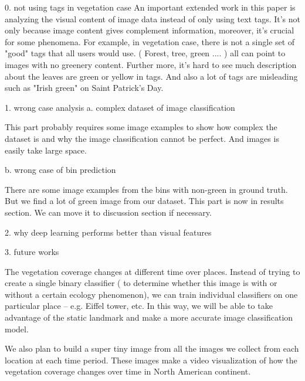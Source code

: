 
0. not using tags in vegetation case
An important extended work in this paper is analyzing the visual content of image data instead of
only using text tags. It's not only because image content gives complement information, moreover,
 it's crucial for some phenomena. For example, in vegetation case, 
there is not a single set of "good"
tags that all users would use. ( Forest, tree, green .... ) all can point to images with no greenery content.
Further more, it's hard to see much description about the leaves are green or yellow in tags.
And also a lot of tags are misleading such as "Irish green" on Saint Patrick's Day. 

1. wrong case analysis
a. complex dataset of image classification

This part probably requires some image examples to show how complex the dataset is and why the 
image classification cannot be perfect. 
And images is easily take large space.

b. wrong case of bin prediction

There are some image examples from the bins with non-green in ground truth. But we find a lot of 
green image from our dataset.
This part is now in results section. We can move it to discussion section if necessary.

2. why deep learning performs better than visual features

3. future works

The vegetation coverage changes at different time over places. 
Instead of trying to create a single binary classifier ( to determine whether this image is with or
without a certain ecology phenomenon),
we can train individual classifiers on one particular place 
-- e.g. Eiffel tower, etc. 
In this way, we will be able to 
take advantage of the static landmark and make a more accurate image classification model.


We also plan to build a super tiny image from all the images we collect from each location at each time period. 
These images make a video visualization of how the vegetation coverage changes over time in North American continent.

